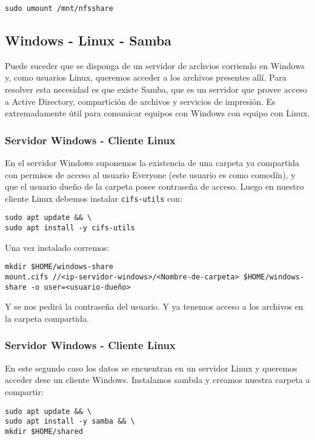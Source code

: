 \begin{lstlisting}
sudo umount /mnt/nfsshare
\end{lstlisting}

\subsection{Windows - Linux - Samba}

Puede suceder que se disponga de un servidor de archvios corriendo en Windows y, como usuarios Linux, queremos acceder a los archivos presentes allí. Para resolver esta necesidad es que existe Samba, que es un servidor que provee acceso a Active Directory, compartición de archivos y servicios de impresión. Es extremadamente útil para comunicar equipos con Windows con equipo con Linux.

\subsubsection{Servidor Windows - Cliente Linux}

En el servidor Windows suponemos la existencia de una carpeta ya compartida con permisos de acceso al usuario Everyone (este usuario es como comodín), y que el usuario dueño de la carpeta posee contraseña de acceso. Luego en nuestro cliente Linux debemos instalar \texttt{cifs-utils} con:

\begin{lstlisting}
sudo apt update && \
sudo apt install -y cifs-utils
\end{lstlisting}

Una vez instalado corremos:

\begin{lstlisting}
mkdir $HOME/windows-share
mount.cifs //<ip-servidor-windows>/<Nombre-de-carpeta> $HOME/windows-share -o user=<usuario-dueño>
\end{lstlisting}

Y se nos pedirá la contraseña del usuario. Y ya tenemos acceso a los archivos en la carpeta compartida.

\subsubsection{Servidor Windows - Cliente Linux}

En este segundo caso los datos se encuentran en un servidor Linux y queremos acceder dese un cliente Windows. Instalamos sambda y creamos nuestra carpeta a compartir:

\begin{lstlisting}
sudo apt update && \
sudo apt install -y samba && \
mkdir $HOME/shared
\end{lstlisting}

